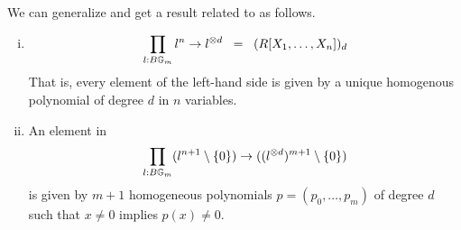 We can generalize 
and get a result related to  as follows.
 
\begin{lemma}\label{hom}
  \begin{enumerate}[(i)]
    \item
      \[  \prod_{l:B\mathbb{G}_m}l^n\rightarrow l^{\otimes d} \;\;=\;\; (R[X_1, \dots, X_n])_d \]
      That is,
      every element of the left-hand side is given by
      a unique homogenous polynomial of degree $d$ in $n$ variables.
    \item
      An element in
      $$\prod_{l:B\mathbb{G}_m}(l^{n+1}\setminus\{0\})\rightarrow ((l^{\otimes d})^{m+1}\setminus\{0\})$$
      is given by $m+1$ homogeneous polynomials $p = (p_0,\dots,p_m)$ of degree $d$ such that
      $x\neq 0$ implies $p(x)\neq 0$.
  \end{enumerate}
\end{lemma}

